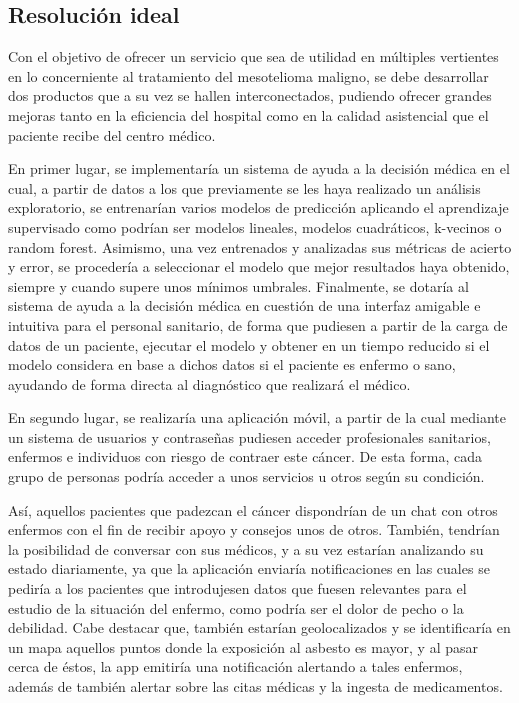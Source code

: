 \documentclass{article}
\begin{document}
\subsection{Resolución ideal}

Con el objetivo  de  ofrecer  un  servicio  que  sea  de  utilidad  en
múltiples vertientes en lo concerniente al tratamiento del mesotelioma
maligno, se debe desarrollar dos productos que	a  su  vez  se	hallen
interconectados,  pudiendo  ofrecer  grandes  mejoras  tanto   en   la
eficiencia del hospital como en la calidad asistencial que el paciente
recibe del centro médico.

En primer lugar, se implementaría un sistema de ayuda  a  la  decisión
médica en el cual, a partir de datos a los que previamente se les haya
realizado un análisis exploratorio, se entrenarían varios  modelos  de
predicción aplicando  el  aprendizaje  supervisado  como  podrían  ser
modelos lineales, modelos  cuadráticos,  k-vecinos  o  random  forest.
Asimismo, una vez entrenados y analizadas sus métricas	de  acierto  y
error, se procedería a seleccionar el modelo que mejor resultados haya
obtenido, siempre y cuando supere unos mínimos umbrales.   Finalmente,
se dotaría al sistema de ayuda a la decisión médica en cuestión de una
interfaz amigable e intuitiva para el personal sanitario, de forma que
pudiesen a partir de la carga de datos de  un  paciente,  ejecutar  el
modelo y obtener en un tiempo reducido si el modelo considera en  base
a dichos datos si el paciente es enfermo o  sano,  ayudando  de  forma
directa al diagnóstico que realizará el médico.

En segundo lugar, se realizaría una aplicación móvil, a partir	de  la
cual mediante un sistema de usuarios y	contraseñas  pudiesen  acceder
profesionales sanitarios, enfermos e individuos con riesgo de contraer
este cáncer.  De esta forma, cada grupo de personas podría  acceder  a
unos servicios u otros según su condición.

Así, aquellos pacientes que padezcan el cáncer dispondrían de un  chat
con otros enfermos con el fin de recibir  apoyo  y  consejos  unos  de
otros.	También, tendrían la posibilidad de conversar con sus médicos,
y a su vez estarían  analizando  su  estado  diariamente,  ya  que  la
aplicación enviaría notificaciones en las  cuales  se  pediría	a  los
pacientes que introdujesen datos que fuesen relevantes para el estudio
de la situación del enfermo, como podría ser el dolor de  pecho  o  la
debilidad.  Cabe destacar que, también estarían  geolocalizados  y  se
identificaría en un  mapa  aquellos  puntos  donde  la	exposición  al
asbesto es mayor, y al pasar cerca  de	éstos,	la  app  emitiría  una
notificación alertando a tales enfermos,  además  de  también  alertar
sobre	las   citas   médicas	y   la	 ingesta   de	 medicamentos.
\end{document}
